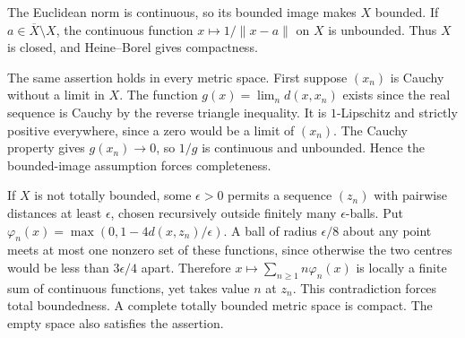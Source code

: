 The Euclidean norm is continuous, so its bounded image makes $X$ bounded. If $a\in\overline X\setminus X$, the continuous function $x\mapsto1/\|x-a\|$ on $X$ is unbounded. Thus $X$ is closed, and Heine--Borel gives compactness.

The same assertion holds in every metric space. First suppose $(x_n)$ is Cauchy without a limit in $X$. The function $g(x)=\lim_n d(x,x_n)$ exists since the real sequence is Cauchy by the reverse triangle inequality. It is $1$-Lipschitz and strictly positive everywhere, since a zero would be a limit of $(x_n)$. The Cauchy property gives $g(x_n)\to0$, so $1/g$ is continuous and unbounded. Hence the bounded-image assumption forces completeness.

If $X$ is not totally bounded, some $\epsilon>0$ permits a sequence $(z_n)$ with pairwise distances at least $\epsilon$, chosen recursively outside finitely many $\epsilon$-balls. Put $\varphi_n(x)=\max(0,1-4d(x,z_n)/\epsilon)$. A ball of radius $\epsilon/8$ about any point meets at most one nonzero set of these functions, since otherwise the two centres would be less than $3\epsilon/4$ apart. Therefore $x\mapsto\sum_{n\ge1} n\varphi_n(x)$ is locally a finite sum of continuous functions, yet takes value $n$ at $z_n$. This contradiction forces total boundedness. A complete totally bounded metric space is compact. The empty space also satisfies the assertion.
